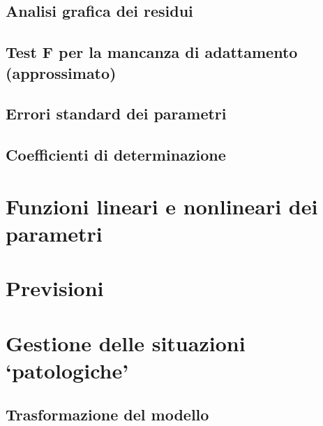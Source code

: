 \documentclass[a4paper,12pt,oneside]{book}
\begin{document}
\hypertarget{analisi-grafica-dei-residui-1}{%
\subsection{Analisi grafica dei residui}\label{analisi-grafica-dei-residui-1}}

\hypertarget{test-f-per-la-mancanza-di-adattamento-approssimato}{%
\subsection{Test F per la mancanza di adattamento (approssimato)}\label{test-f-per-la-mancanza-di-adattamento-approssimato}}

\hypertarget{errori-standard-dei-parametri-1}{%
\subsection{Errori standard dei parametri}\label{errori-standard-dei-parametri-1}}

\hypertarget{coefficienti-di-determinazione}{%
\subsection{Coefficienti di determinazione}\label{coefficienti-di-determinazione}}

\hypertarget{funzioni-lineari-e-nonlineari-dei-parametri}{%
\section{Funzioni lineari e nonlineari dei parametri}\label{funzioni-lineari-e-nonlineari-dei-parametri}}

\hypertarget{previsioni-1}{%
\section{Previsioni}\label{previsioni-1}}

\hypertarget{gestione-delle-situazioni-patologiche}{%
\section{Gestione delle situazioni `patologiche'}\label{gestione-delle-situazioni-patologiche}}

\hypertarget{trasformazione-del-modello}{%
\subsection{Trasformazione del modello}\label{trasformazione-del-modello}}
\end{document}
